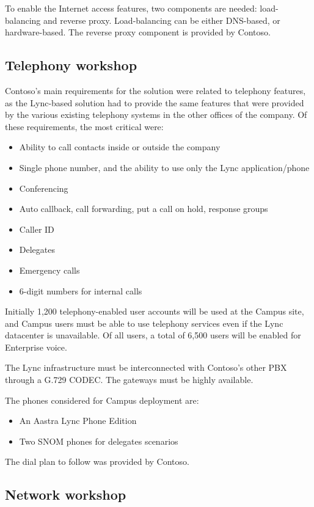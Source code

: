 	To enable the Internet access features, two components are needed: load-balancing and reverse proxy.
	Load-balancing can be either DNS-based, or hardware-based. The reverse proxy component is provided by Contoso.


\subsection{Telephony workshop}
	Contoso's main requirements for the solution were related to telephony features, as the Lync-based solution had to provide the same features that were provided by the various existing telephony systems in the other offices of the company.
	Of these requirements, the most critical were:
	\begin{itemize}
		\item Ability to call contacts inside or outside the company
		\item Single phone number, and the ability to use only the Lync application/phone
		\item Conferencing
		\item Auto callback, call forwarding, put a call on hold, response groups
		\item Caller ID
		\item Delegates
		\item Emergency calls
		\item 6-digit numbers for internal calls
	\end{itemize}

	Initially 1,200 telephony-enabled user accounts will be used at the Campus site, and Campus users must be able to use telephony services even if the Lync datacenter is unavailable. Of all users, a total of 6,500 users will be enabled for Enterprise voice.

	The Lync infrastructure must be interconnected with Contoso's other PBX through a G.729 CODEC. The gateways must be highly available.

	The phones considered for Campus deployment are:
	\begin{itemize}
		\item An Aastra Lync Phone Edition
		\item Two SNOM phones for delegates scenarios
	\end{itemize}

	The dial plan to follow was provided by Contoso.


\subsection{Network workshop}

